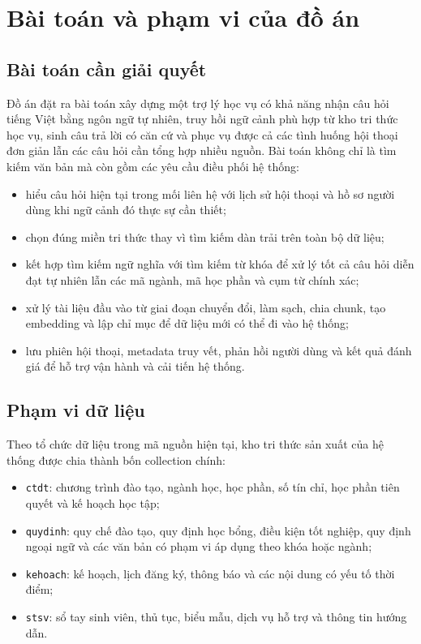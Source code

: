 \documentclass[../DoAn.tex]{subfiles}
\begin{document}
\section{Bài toán và phạm vi của đồ án}
\label{sec:phamvi}

\subsection{Bài toán cần giải quyết}

Đồ án đặt ra bài toán xây dựng một trợ lý học vụ có khả năng nhận câu hỏi tiếng
Việt bằng ngôn ngữ tự nhiên, truy hồi ngữ cảnh phù hợp từ kho tri thức học vụ,
sinh câu trả lời có căn cứ và phục vụ được cả các tình huống hội thoại đơn giản
lẫn các câu hỏi cần tổng hợp nhiều nguồn. Bài toán không chỉ là tìm kiếm văn bản
mà còn gồm các yêu cầu điều phối hệ thống:

\begin{itemize}
    \item hiểu câu hỏi hiện tại trong mối liên hệ với lịch sử hội thoại và hồ sơ
    người dùng khi ngữ cảnh đó thực sự cần thiết;
    \item chọn đúng miền tri thức thay vì tìm kiếm dàn trải trên toàn bộ dữ liệu;
    \item kết hợp tìm kiếm ngữ nghĩa với tìm kiếm từ khóa để xử lý tốt cả câu hỏi
    diễn đạt tự nhiên lẫn các mã ngành, mã học phần và cụm từ chính xác;
    \item xử lý tài liệu đầu vào từ giai đoạn chuyển đổi, làm sạch, chia chunk,
    tạo embedding và lập chỉ mục để dữ liệu mới có thể đi vào hệ thống;
    \item lưu phiên hội thoại, metadata truy vết, phản hồi người dùng và kết quả
    đánh giá để hỗ trợ vận hành và cải tiến hệ thống.
\end{itemize}

\subsection{Phạm vi dữ liệu}

Theo tổ chức dữ liệu trong mã nguồn hiện tại, kho tri thức sản xuất của hệ thống
được chia thành bốn collection chính:

\begin{itemize}
    \item \texttt{ctdt}: chương trình đào tạo, ngành học, học phần, số tín chỉ,
    học phần tiên quyết và kế hoạch học tập;
    \item \texttt{quydinh}: quy chế đào tạo, quy định học bổng, điều kiện tốt
    nghiệp, quy định ngoại ngữ và các văn bản có phạm vi áp dụng theo khóa hoặc
    ngành;
    \item \texttt{kehoach}: kế hoạch, lịch đăng ký, thông báo và các nội dung
    có yếu tố thời điểm;
    \item \texttt{stsv}: sổ tay sinh viên, thủ tục, biểu mẫu, dịch vụ hỗ trợ và
    thông tin hướng dẫn.
\end{itemize}
\end{document}
